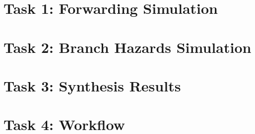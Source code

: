 \documentclass[11pt,a4paper,titlepage,oneside]{article}
\begin{document}
\maketitle

\section*{Task 1: Forwarding Simulation}

\clearpage
\section*{Task 2: Branch Hazards Simulation}

\clearpage
\section*{Task 3: Synthesis Results}

\clearpage
\section*{Task 4: Workflow}

\end{document}
